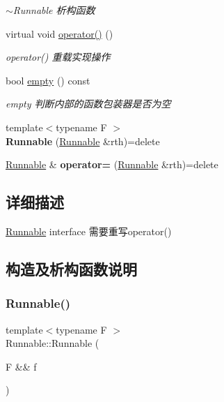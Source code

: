 \begin{DoxyCompactItemize}
\begin{DoxyCompactList}\small\item\em $\sim$\+Runnable 析构函数 \end{DoxyCompactList}\item 
\mbox{\label{classRunnable_a38bf849dab4bbb86fc5bc6e7aff383e0}} 
virtual void \hyperlink{classRunnable_a38bf849dab4bbb86fc5bc6e7aff383e0}{operator()} ()
\begin{DoxyCompactList}\small\item\em operator() 重载实现操作 \end{DoxyCompactList}\item 
bool \hyperlink{classRunnable_a3abba14a5cf19709cef2d299ee68acae}{empty} () const
\begin{DoxyCompactList}\small\item\em empty 判断内部的函数包装器是否为空 \end{DoxyCompactList}\item 
\mbox{\label{classRunnable_ae4f6e15a7503492b910f53ca8daf1795}} 
{\footnotesize template$<$typename F $>$ }\\{\bfseries Runnable} (\hyperlink{classRunnable}{Runnable} \&rth)=delete
\item 
\mbox{\label{classRunnable_a387d41d3a0c6d93e4aa4a72992531b52}} 
\hyperlink{classRunnable}{Runnable} \& {\bfseries operator=} (\hyperlink{classRunnable}{Runnable} \&rth)=delete
\end{DoxyCompactItemize}


\subsection{详细描述}
\hyperlink{classRunnable}{Runnable} interface 需要重写operator() 

\subsection{构造及析构函数说明}
\mbox{\label{classRunnable_ab052afa8b53dd1e7c28e978962839446}} 
\subsubsection{\texorpdfstring{Runnable()}{Runnable()}\hspace{0.1cm}{\footnotesize\ttfamily [1/3]}}
{\footnotesize\ttfamily template$<$typename F $>$ \\
Runnable\+::\+Runnable (\begin{DoxyParamCaption}\item[{F \&\&}]{f }\end{DoxyParamCaption})\hspace{0.3cm}{\ttfamily [inline]}}



